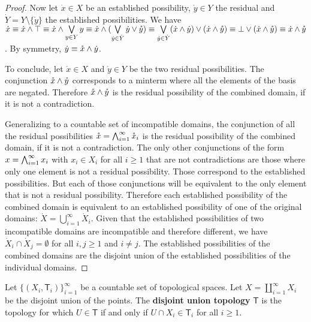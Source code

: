 \documentclass[11pt,letterpaper,fleqn]{memoir} %
\begin{document}
\begin{mathSection}
\begin{proof}
		Now let $\dot{x} \in X$ be an established possibility, $\mathring{y} \in Y$ the residual and $\dot{Y} = Y \setminus \{\mathring{y}\}$ the established possibilities. We have $\dot{x} \equiv \dot{x} \wedge \top \equiv \dot{x} \wedge \bigvee\limits_{y \in Y} y \equiv \dot{x} \wedge (\bigvee\limits_{\dot{y} \in \dot{Y}} \dot{y} \vee \mathring{y}) \equiv \bigvee\limits_{\dot{y} \in \dot{Y}} (\dot{x} \wedge \dot{y}) \vee (\dot{x} \wedge \mathring{y}) \equiv \bot \vee (\dot{x} \wedge \mathring{y}) \equiv \dot{x} \wedge \mathring{y}$. By symmetry, $\dot{y} \equiv \mathring{x} \wedge \dot{y}$.
		
		To conclude, let $\mathring{x} \in X$ and $\mathring{y} \in Y$ be the two residual possibilities. The conjunction $\mathring{x} \wedge \mathring{y}$ corresponds to a minterm where all the elements of the basis are negated. Therefore $\mathring{x} \wedge \mathring{y}$ is the residual possibility of the combined domain, if it is not a contradiction. 
		
		Generalizing to a countable set of incompatible domains, the conjunction of all the residual possibilities $\mathring{x}= \bigwedge_{i=1}^{\infty} \mathring{x}_i$ is the residual possibility of the combined domain, if it is not a contradiction. The only other conjunctions of the form $x= \bigwedge_{i=1}^{\infty} x_i$ with $x_i \in X_i$ for all $i \geq 1$ that are not contradictions are those where only one element is not a residual possibility. Those correspond to the established possibilities. But each of those conjunctions will be equivalent to the only element that is not a residual possibility. Therefore each established possibility of the combined domain is equivalent to an established possibility of one of the original domains: $\dot{X} = \bigcup\limits_{i=1}^{\infty} \dot{X}_i$. Given that the established possibilities of two incompatible domains are incompatible and therefore different, we have $\dot{X}_i \cap \dot{X}_j = \emptyset$ for all $i,j \geq 1$ and $i \neq j$. The established possibilities of the combined domains are the disjoint union of the established possibilities of the individual domains.
	\end{proof}

	\begin{defn}
		Let $\{(X_i, \mathsf{T}_i)\}_{i=1}^{\infty}$ be a countable set of topological spaces. Let $X=\coprod\limits_{i=1}^{\infty} X_i$ be the disjoint union of the points. The \textbf{disjoint union topology} $\mathsf{T}$ is the topology for which $U \in \mathsf{T}$ if and only if $U \cap X_i \in \mathsf{T}_i$ for all $i \geq 1$.
	\end{defn}


\end{mathSection}
\end{document}
